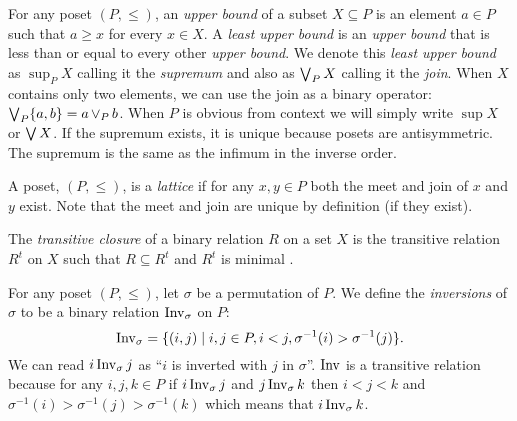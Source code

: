 	\begin{definition}
		For any poset $(P, \le)$, an \emph{upper bound} of a subset $X \subseteq P$ is an element $a \in P$ such that $a \ge x$ for every $x \in X$. A \emph{least upper bound} is an \emph{upper bound} that is less than or equal to every other \emph{upper bound}. We denote this \emph{least upper bound} as $\sup_P X$ calling it the \emph{supremum} \cite{birkhoﬀ1967lattice} and also as $\operatorname{\bigvee}_P X$ calling it the \emph{join}. When $X$ contains only two elements, we can use the join as a binary operator: $\operatorname{\bigvee}_P \{a, b\} = a \operatorname{\vee}_P b$. When $P$ is obvious from context we will simply write $\sup X$ or $\operatorname{\bigvee} X$. If the supremum exists, it is unique because posets are antisymmetric. The supremum is the same as the infimum in the inverse order.
	\end{definition}

	\begin{definition}
		\label{lattice-definition}
		A poset, $(P, \le)$, is a \emph{lattice} if for any $x, y \in P$ both the meet and join of $x$ and $y$ exist. Note that the meet and join are unique by definition (if they exist).
	\end{definition}

	\begin{definition}
		\label{transitive-closure-definition}
		The \emph{transitive closure} of a binary relation $R$ on a set $X$ is the transitive relation $R^t$ on $X$ such that $R \subseteq R^t$ and $R^t$ is minimal \cite[p. 337]{lidl1998applied}.
	\end{definition}

	\begin{definition}
		\label{inversion-definition}
		For any poset $(P, \le)$, let $\sigma$ be a permutation of $P$. We define the \emph{inversions} of $\sigma$ to be a binary relation $\operatorname{Inv}_{\sigma}$ on $P$:
		\[
			\operatorname{Inv}_{\sigma} = \{(i,j) \mid i, j \in P, i < j, \sigma^{-1}(i) > \sigma^{-1}(j)\}.
		\]
		We can read $i \operatorname{Inv}_{\sigma} j$ as ``$i$ is inverted with $j$ in $\sigma$''. $\operatorname{Inv}$ is a transitive relation because for any $i,j,k \in P$ if $i \operatorname{Inv}_{\sigma} j$ and $j \operatorname{Inv}_{\sigma} k$ then $i < j < k$ and $\sigma^{-1}(i) > \sigma^{-1}(j) > \sigma^{-1}(k)$ which means that $i \operatorname{Inv}_{\sigma} k$.
	\end{definition}


